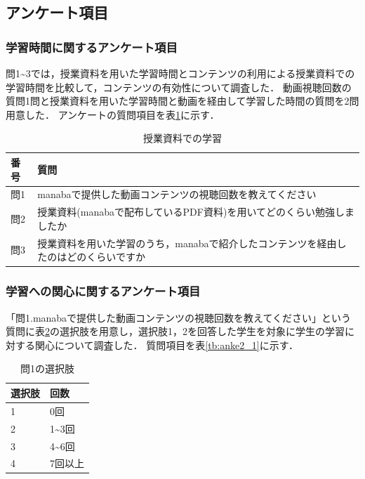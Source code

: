 \documentclass[12pt,a4j,titlepage]{ltjsarticle}
\begin{document}
\subsection{アンケート項目}

\subsubsection{学習時間に関するアンケート項目}
問1\textasciitilde3では，授業資料を用いた学習時間とコンテンツの利用による授業資料での学習時間を比較して，コンテンツの有効性について調査した．
動画視聴回数の質問1問と授業資料を用いた学習時間と動画を経由して学習した時間の質問を2問用意した．
アンケートの質問項目を表\ref{tb:anke2}に示す．

\begin{table}[htbp]
  \caption{授業資料での学習}
  \begin{center}
\begin{tabular}{ll}\hline
               番号 & 質問 \\ \hline
               問1 & manabaで提供した動画コンテンツの視聴回数を教えてください\\
               問2 & 授業資料(manabaで配布しているPDF資料)を用いてどのくらい勉強しましたか\\
               問3 & 授業資料を用いた学習のうち，manabaで紹介したコンテンツを経由したのはどのくらいですか\\
              \hline
               \end{tabular}
               \end{center}
               \label{tb:anke2}
               \end{table}

\clearpage

\subsubsection{学習への関心に関するアンケート項目}
「問1.manabaで提供した動画コンテンツの視聴回数を教えてください」という質問に表\ref{tb:anke2_0}の選択肢を用意し，選択肢1，2を回答した学生を対象に学生の学習に対する関心について調査した．
質問項目を表\ref{tb:anke2_1}に示す．

\begin{table}[htbp]
  \caption{問1の選択肢}
  \begin{center}
\begin{tabular}{ll}\hline
選択肢 & 回数\\ \hline
               1 & 0回\\
               2 & 1\textasciitilde3回\\
               3 & 4\textasciitilde6回\\
               4 & 7回以上\\
               \hline
                \end{tabular}
                \end{center}
                \label{tb:anke2_0}
                \end{table}
\end{document}
